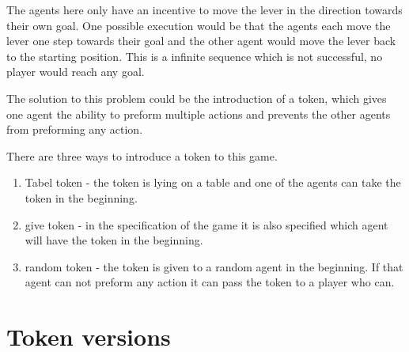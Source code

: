
  The agents here only have an incentive to move the lever in the direction towards their own goal. One possible execution would be that the agents each move the lever one step towards their goal and the other agent would move the lever back to the starting position. This is a infinite sequence which is not successful, no player would reach any goal.

  The solution to this problem could be the introduction of a token, which gives one agent the ability to preform multiple actions and prevents the other agents from preforming any action.

  There are three ways to introduce a token to this game.
  \begin{enumerate}
    \item Tabel token - the token is lying on a table and one of the agents can take the token in the beginning.
    \item give token - in the specification of the game it is also specified which agent will have the token in the beginning.
    \item random token - the token is given to a random agent in the beginning. If that agent can not preform any action it can pass the token to a player who can.
  \end{enumerate}

\section{Token versions}

